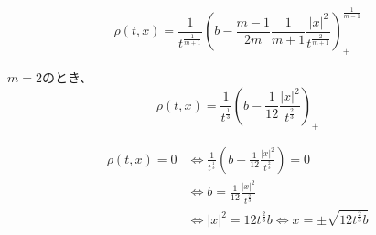 \documentclass{jsarticle}
\theoremstyle{definition}
\begin{document}
\begin{equation}
    \label{eq:barenblatt}
    \rho(t,x)= \frac{1}{t^{\frac{1}{m + 1}}}\left(b - \frac{m - 1}{2m}\frac{1}{m + 1} \frac{ |x|^2}{t^{\frac{2}{m + 1}}} \right)_+^{\frac{1}{m - 1}}
\end{equation}

$m = 2$のとき、
\begin{equation}
    \label{eq:barenblatt:m=2}
    \rho(t,x)= \frac{1}{t^{\frac{1}{3}}}\left(b - \frac{1}{12} \frac{ |x|^2}{t^{\frac{2}{3}}} \right)_+
\end{equation}

\begin{align*}
    \rho(t, x) = 0 &\iff \frac{1}{t^{\frac{1}{3}}}\left(b - \frac{1}{12} \frac{ |x|^2}{t^{\frac{2}{3}}} \right) = 0\\
                    &\iff b = \frac{1}{12}\frac{|x|^2}{t^{\frac{2}{3}}} \\
                    &\iff |x|^2 = 12t^{\frac{2}{3}}b \iff x = \pm \sqrt{12t^{\frac{2}{3}}b}
\end{align*}


        
        
        
\end{document}

